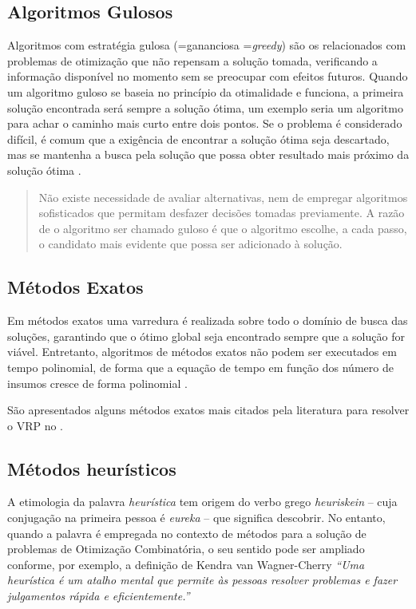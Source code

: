 \subsection{Algoritmos Gulosos}
\label{gulosos}
Algoritmos com estratégia gulosa (=gananciosa =\emph{greedy}) \cite{feofiloff} são os relacionados com problemas de otimização que não repensam a solução tomada, verificando a informação disponível no momento sem se preocupar com efeitos futuros. Quando um algoritmo guloso se baseia no princípio da otimalidade e funciona, a primeira solução encontrada será sempre a solução ótima, um exemplo seria um algoritmo para achar o caminho mais curto entre dois pontos. Se o problema é considerado difícil, é comum que a exigência de encontrar a solução ótima seja descartado, mas se mantenha a busca pela solução que possa obter resultado mais próximo da solução ótima \cite[p. 60]{ziviani}.

\begin{quote}
Não existe necessidade de avaliar alternativas, nem de empregar algoritmos sofisticados que permitam desfazer decisões tomadas previamente. A razão de o algoritmo ser chamado guloso é que o algoritmo escolhe, a cada passo, o candidato mais evidente que possa ser adicionado à solução.
\end{quote}

\subsection{Métodos Exatos} \label{metodos-exatos}

Em métodos exatos uma varredura é realizada sobre todo o domínio de busca das soluções, garantindo que o ótimo global seja encontrado sempre que a solução for viável. Entretanto, algoritmos de métodos exatos não podem ser executados em tempo polinomial, de forma que a equação de tempo em função dos número de insumos cresce de forma polinomial \cite{maxwell}. 

São apresentados alguns métodos exatos mais citados pela literatura para resolver o VRP no .

\subsection{Métodos heurísticos}\label{heuristica}
A etimologia da palavra \emph{heurística} tem origem do verbo grego \emph{heuriskein} -- cuja conjugação na primeira pessoa é \emph{eureka} -- que significa descobrir. No entanto, quando a palavra é empregada no contexto de métodos para a solução de problemas de Otimização Combinatória, o seu sentido pode ser ampliado conforme, por exemplo, a definição de Kendra van Wagner-Cherry \emph{``Uma heurística é um atalho mental que permite às pessoas resolver problemas e fazer julgamentos rápida e eficientemente.''} \cite{goldbarg}


